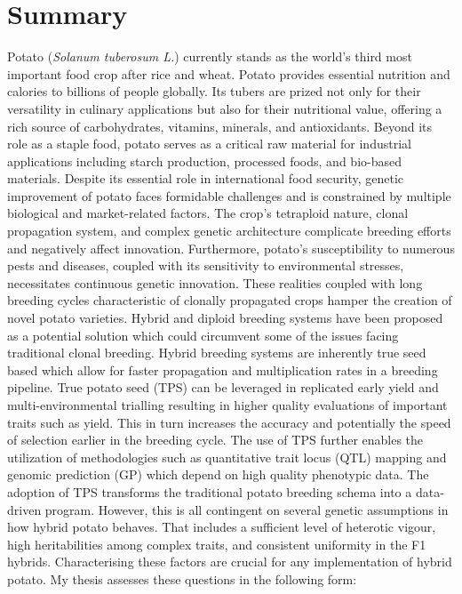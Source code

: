 \chapter{Summary}
\label{cha:Summary}

Potato (\textit{Solanum tuberosum L.}) currently stands as the world's third most important food crop after rice and wheat. Potato provides essential nutrition and calories to billions of people globally. Its tubers are prized not only for their versatility in culinary applications but also for their nutritional value, offering a rich source of carbohydrates, vitamins, minerals, and antioxidants. Beyond its role as a staple food, potato serves as a critical raw material for industrial applications including starch production, processed foods, and bio-based materials. Despite its essential role in international food security, genetic improvement of potato faces formidable challenges and is constrained by multiple biological and market-related factors. The crop's tetraploid nature, clonal propagation system, and complex genetic architecture complicate breeding efforts and negatively affect innovation. Furthermore, potato's susceptibility to numerous pests and diseases, coupled with its sensitivity to environmental stresses, necessitates continuous genetic innovation. These realities coupled with long breeding cycles characteristic of clonally propagated crops hamper the creation of novel potato varieties. Hybrid and diploid breeding systems have been proposed as a potential solution which could circumvent some of the issues facing traditional clonal breeding. Hybrid breeding systems are inherently true seed based which allow for faster propagation and multiplication rates in a breeding pipeline. True potato seed (TPS) can be leveraged in replicated early yield and multi-environmental trialling resulting in higher quality evaluations of important traits such as yield. This in turn increases the accuracy and potentially the speed of selection earlier in the breeding cycle. The use of TPS further enables the utilization of methodologies such as quantitative trait locus (QTL) mapping and genomic prediction (GP) which depend on high quality phenotypic data. The adoption of TPS transforms the traditional potato breeding schema into a data-driven program. However, this is all contingent on several genetic assumptions in how hybrid potato behaves. That includes a sufficient level of heterotic vigour, high heritabilities among complex traits, and consistent uniformity in the F1 hybrids. Characterising these factors are crucial for any implementation of hybrid potato. My thesis assesses these questions in the following form:

